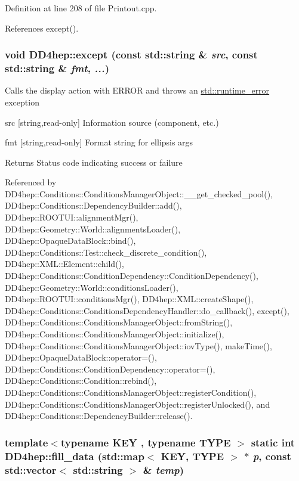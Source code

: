 Definition at line 208 of file Printout.cpp.

References except().\hypertarget{namespace_d_d4hep_af8602b0b80e0c252cf28e5fbbc81abcc}{
\subsubsection[{except}]{\setlength{\rightskip}{0pt plus 5cm}void DD4hep::except (const std::string \& {\em src}, \/  const std::string \& {\em fmt}, \/   {\em ...})}}
\label{namespace_d_d4hep_af8602b0b80e0c252cf28e5fbbc81abcc}
Calls the display action with ERROR and throws an \hyperlink{classstd_1_1runtime__error}{std::runtime\_\-error} exception \begin{DoxyItemize}
\item src \mbox{[}string,read-\/only\mbox{]} Information source (component, etc.) \item fmt \mbox{[}string,read-\/only\mbox{]} Format string for ellipsis args \begin{DoxyReturn}{Returns}
Status code indicating success or failure 
\end{DoxyReturn}
\end{DoxyItemize}


Referenced by DD4hep::Conditions::ConditionsManagerObject::\_\-\_\-get\_\-checked\_\-pool(), DD4hep::Conditions::DependencyBuilder::add(), DD4hep::ROOTUI::alignmentMgr(), DD4hep::Geometry::World::alignmentsLoader(), DD4hep::OpaqueDataBlock::bind(), DD4hep::Conditions::Test::check\_\-discrete\_\-condition(), DD4hep::XML::Element::child(), DD4hep::Conditions::ConditionDependency::ConditionDependency(), DD4hep::Geometry::World::conditionsLoader(), DD4hep::ROOTUI::conditionsMgr(), DD4hep::XML::createShape(), DD4hep::Conditions::ConditionsDependencyHandler::do\_\-callback(), except(), DD4hep::Conditions::ConditionsManagerObject::fromString(), DD4hep::Conditions::ConditionsManagerObject::initialize(), DD4hep::Conditions::ConditionsManagerObject::iovType(), makeTime(), DD4hep::OpaqueDataBlock::operator=(), DD4hep::Conditions::ConditionDependency::operator=(), DD4hep::Conditions::Condition::rebind(), DD4hep::Conditions::ConditionsManagerObject::registerCondition(), DD4hep::Conditions::ConditionsManagerObject::registerUnlocked(), and DD4hep::Conditions::DependencyBuilder::release().\hypertarget{namespace_d_d4hep_a49ba73b05ed6d56e93f3462fc4ee7bda}{
\subsubsection[{fill\_\-data}]{\setlength{\rightskip}{0pt plus 5cm}template$<$typename KEY , typename TYPE $>$ static int DD4hep::fill\_\-data (std::map$<$ KEY, TYPE $>$ $\ast$ {\em p}, \/  const std::vector$<$ std::string $>$ \& {\em temp})}}
\label{namespace_d_d4hep_a49ba73b05ed6d56e93f3462fc4ee7bda}


